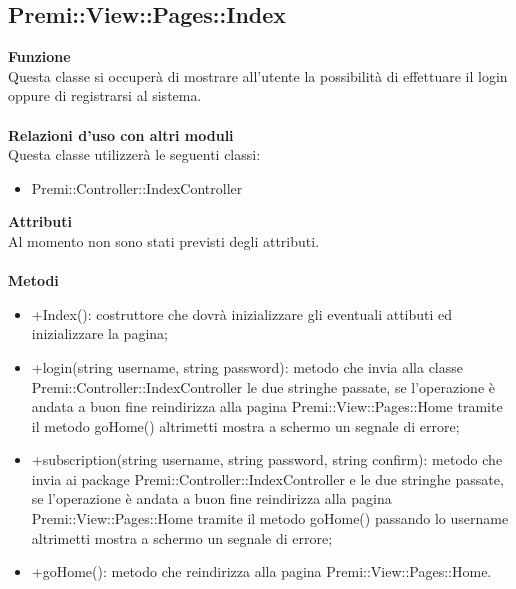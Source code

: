 {			\subsection{Premi::View::Pages::Index}{
					\textbf{Funzione}\\
						\indent Questa classe si occuperà di mostrare all'utente la possibilità di effettuare il login oppure di registrarsi al sistema.\\\\
					\textbf{Relazioni d'uso con altri moduli}\\
						\indent Questa classe utilizzerà le seguenti classi:
					\begin{itemize}
						\item Premi::Controller::IndexController
					\end{itemize}
					\textbf{Attributi}\\
						\indent Al momento non sono stati previsti degli attributi.\\\\
					\textbf{Metodi}
						\begin{itemize}
						\item +Index(): costruttore che dovrà inizializzare gli eventuali attibuti ed inizializzare la pagina;
						\item +login(string username, string password): metodo che invia alla classe Premi::Controller::IndexController le due stringhe passate, se l'operazione è andata a buon fine reindirizza alla pagina Premi::View::Pages::Home tramite il metodo goHome() altrimetti mostra a schermo un segnale di errore;
						\item +subscription(string username, string password, string confirm): metodo che invia ai package Premi::Controller::IndexController e le due stringhe passate, se l'operazione è andata a buon fine reindirizza alla pagina Premi::View::Pages::Home tramite il metodo goHome() passando lo username altrimetti mostra a schermo un segnale di errore;
						\item +goHome(): metodo che reindirizza alla pagina Premi::View::Pages::Home.
					\end{itemize}
				}
}
